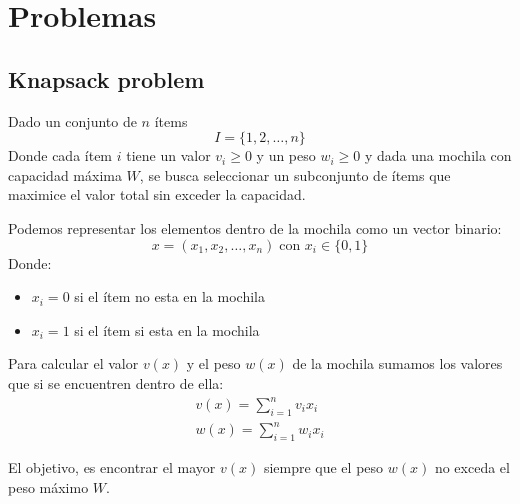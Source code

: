 \chapter{Problemas}

\section{Knapsack problem}

Dado un conjunto de $n$ ítems \[I = \{1,2, \dots, n \}\] Donde cada ítem $i$ tiene un valor $v_i \geq 0$ y un peso $w_i \geq 0$ y dada una mochila con capacidad máxima $W$, se busca seleccionar un subconjunto de ítems que maximice el valor total sin exceder la capacidad.

Podemos representar los elementos dentro de la mochila como un vector binario: 
\[ x = (x_1, x_2, \dots , x_n) \; \text{con } x_i \in \{0, 1\} \]
Donde:
\begin{itemize}
	\item $x_i = 0$ si el ítem no esta en la mochila
	\item $x_i = 1$ si el ítem si esta en la mochila
\end{itemize}

Para calcular el valor $v(x)$ y el peso $w(x)$ de la mochila sumamos los valores que si se encuentren dentro de ella:
\begin{gather*}
	v(x) = \sum_{i = 1}^{n} v_i x_i \\
	w(x) = \sum_{i = 1}^{n} w_i x_i 
\end{gather*}

El objetivo, es encontrar el mayor $v(x)$ siempre que el peso $w(x)$ no exceda el peso máximo $W$. 

